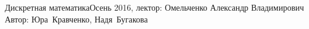 


\BigHeader
	{Дискретная математика}{Осень 2016, лектор: Омельченко Александр Владимирович}
	{Автор: Юра~Кравченко, Надя~Бугакова}


